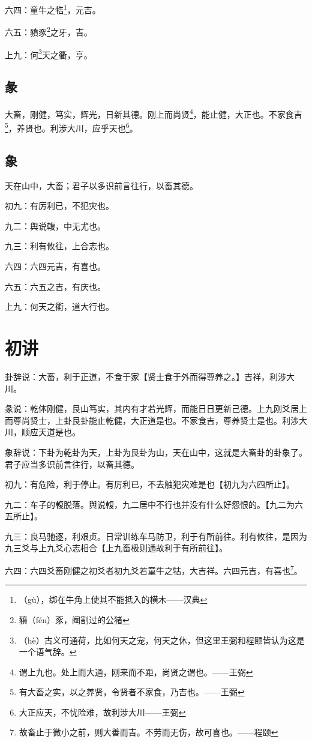 \documentclass[12pt,oneside]{book}
\begin{document}
六四：童牛之牿\footnote{（gù），绑在牛角上使其不能抵入的横木——汉典}，元吉。

六五：豶豕\footnote{豶（fén）豕，阉割过的公猪}之牙，吉。

上九：何\footnote{（hè）古义可通荷，比如何天之宠，何天之休，但这里王弼和程颐皆认为这是一个语气辞。}天之衢，亨。

\subsection{彖}
大畜，刚健，笃实，辉光，日新其德。刚上而尚贤\footnote{谓上九也。处上而大通，刚来而不距，尚贤之谓也。——王弼}，能止健，大正也。不家食吉\footnote{有大畜之实，以之养贤，令贤者不家食，乃吉也。——王弼}，养贤也。利涉大川，应乎天也\footnote{大正应天，不忧险难，故利涉大川——王弼}。

\subsection{象}
天在山中，大畜；君子以多识前言往行，以畜其德。

初九：有厉利已，不犯灾也。

九二：舆说輹，中无尤也。

九三：利有攸往，上合志也。

六四：六四元吉，有喜也。

六五：六五之吉，有庆也。

上九：何天之衢，道大行也。

\section{初讲}
卦辞说：大畜，利于正道，不食于家【贤士食于外而得尊养之。】吉祥，利涉大川。

彖说：乾体刚健，艮山笃实，其内有才若光辉，而能日日更新己德。上九刚爻居上而尊尚贤士，上卦艮卦能止乾健，大正道是也。不家食吉，尊养贤士是也。利涉大川，顺应天道是也。

象辞说：下卦为乾卦为天，上卦为艮卦为山，天在山中，这就是大畜卦的卦象了。君子应当多识前言往行，以畜其德。

初九：有危险，利于停止。有厉利已，不去触犯灾难是也【初九为六四所止】。

九二：车子的輹脱落。舆说輹，九二居中不行也并没有什么好怨恨的。【九二为六五所止】。

九三：良马驰逐，利艰贞。日常训练车马防卫，利于有所前往。利有攸往，是因为九三爻与上九爻心志相合【上九畜极则通故利于有所前往】。

六四：六四爻畜刚健之初爻者初九爻若童牛之牯，大吉祥。六四元吉，有喜也\footnote{故畜止于微小之前，则大善而吉。不劳而无伤，故可喜也。——程颐}。
\end{document}
